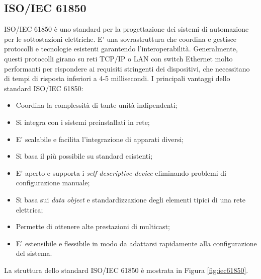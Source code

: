 \subsection{ISO/IEC 61850 \label{sec:IEC61850}}
ISO/IEC 61850 è uno standard per la progettazione dei sistemi di automazione per le sottostazioni elettriche. E' una sovrastruttura che coordina e gestisce protocolli e tecnologie esistenti garantendo l'interoperabilità. Generalmente, questi protocolli girano su reti TCP/IP o LAN con switch Ethernet molto performanti per rispondere ai requisiti stringenti dei dispositivi, che necessitano di tempi di risposta inferiori a 4-5 millisecondi.\newline\newline
I principali vantaggi dello standard ISO/IEC 61850:
\begin{itemize}
	\item Coordina la complessità di tante unità indipendenti;
	\item Si integra con i sistemi preinstallati in rete;
	\item E' scalabile e facilita l'integrazione di apparati diversi;
	\item Si basa il più possibile su standard esistenti;
	\item E' aperto e supporta i \emph{self descriptive device} eliminando problemi di configurazione manuale;
	\item Si basa sui \emph{data object} e standardizzazione degli elementi tipici di una rete elettrica;
	\item Permette di ottenere alte prestazioni di multicast;
	\item E' estensibile e flessibile in modo da adattarsi rapidamente alla configurazione del sistema.
\end{itemize}
\newpage
La struttura dello standard ISO/IEC 61850\cite{iec61850} è mostrata in Figura \ref{fig:iec61850}.

